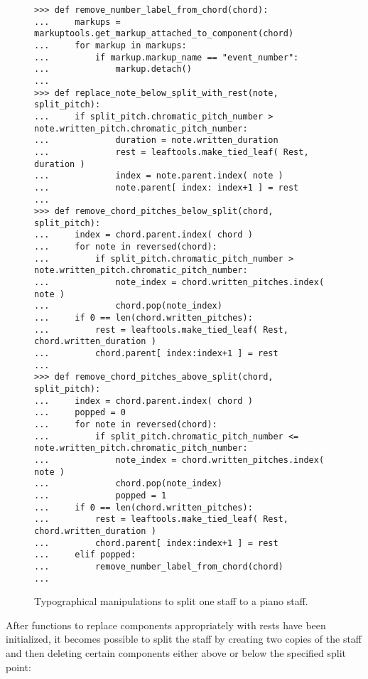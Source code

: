 \begin{figure}[H]
\begin{lstlisting}[basicstyle=\scriptsize\ttfamily, breaklines=True, tabsize=4, showtabs=false, showspaces=false]
>>> def remove_number_label_from_chord(chord):
...     markups = markuptools.get_markup_attached_to_component(chord)
...     for markup in markups:
...         if markup.markup_name == "event_number":
...             markup.detach()
... 
>>> def replace_note_below_split_with_rest(note, split_pitch):
...     if split_pitch.chromatic_pitch_number > note.written_pitch.chromatic_pitch_number:
...             duration = note.written_duration
...             rest = leaftools.make_tied_leaf( Rest, duration )
...             index = note.parent.index( note )
...             note.parent[ index: index+1 ] = rest
... 
>>> def remove_chord_pitches_below_split(chord, split_pitch):
...     index = chord.parent.index( chord )
...     for note in reversed(chord):
...         if split_pitch.chromatic_pitch_number > note.written_pitch.chromatic_pitch_number:
...             note_index = chord.written_pitches.index( note )
...             chord.pop(note_index)
...     if 0 == len(chord.written_pitches):
...         rest = leaftools.make_tied_leaf( Rest, chord.written_duration )
...         chord.parent[ index:index+1 ] = rest
... 
>>> def remove_chord_pitches_above_split(chord, split_pitch):
...     index = chord.parent.index( chord )
...     popped = 0
...     for note in reversed(chord):
...         if split_pitch.chromatic_pitch_number <= note.written_pitch.chromatic_pitch_number:
...             note_index = chord.written_pitches.index( note )
...             chord.pop(note_index)
...             popped = 1
...     if 0 == len(chord.written_pitches):
...         rest = leaftools.make_tied_leaf( Rest, chord.written_duration )
...         chord.parent[ index:index+1 ] = rest
...     elif popped:
...         remove_number_label_from_chord(chord)
... \end{lstlisting}

\caption{Typographical manipulations to split one staff to a piano staff. } 
\end{figure}



After functions to replace components appropriately with rests have been initialized, it becomes possible to split the staff by creating two copies of the staff and then deleting certain components either above or below the specified split point:


